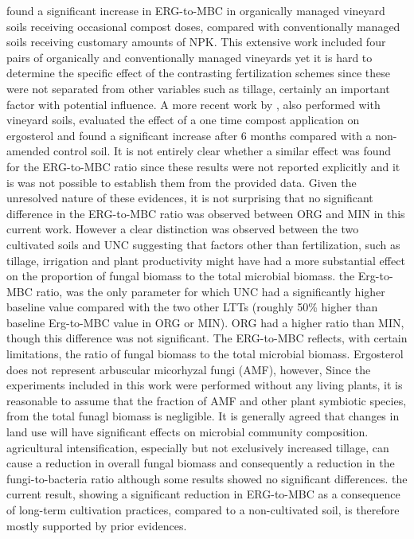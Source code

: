 	\citet{probst2008} found a significant increase in ERG-to-MBC in organically managed vineyard soils receiving occasional compost doses, compared with conventionally managed soils receiving customary amounts of NPK. This extensive work included four pairs of organically and conventionally managed vineyards yet it is hard to determine the specific effect of the contrasting fertilization schemes since these were not separated from other variables such as tillage, certainly an important factor with potential influence. A more recent work by \citet{mackie2015} , also performed with vineyard soils, evaluated the effect of a one time compost application on ergosterol and found a significant increase after 6 months compared with a non-amended control soil. It is not entirely clear whether a similar effect was found for the ERG-to-MBC ratio since these results were not reported explicitly and it is was not possible to establish them from the provided data.
	Given the unresolved nature of these evidences, it is not surprising that no significant difference in the ERG-to-MBC ratio was observed between ORG and MIN in this current work. However a clear distinction was observed between the two cultivated soils and UNC suggesting that factors other than fertilization, such as tillage, irrigation and plant productivity might have had a more substantial effect on the proportion of fungal biomass to the total microbial biomass.
	the Erg-to-MBC ratio, was the only parameter for which UNC had a significantly higher baseline value compared with the two other LTTs (roughly 50\% higher than baseline Erg-to-MBC value in ORG or MIN).
	ORG had a higher ratio than MIN, though this difference was not significant. The ERG-to-MBC reflects, with certain limitations, the ratio of fungal biomass to the total microbial biomass. Ergosterol does not represent arbuscular micorhyzal fungi (AMF), however, Since the experiments included in this work were performed without any living plants, it is reasonable to assume that the fraction of AMF and other plant symbiotic species, from the total funagl biomass is negligible.
	It is generally agreed that changes in land use will have significant effects on microbial community composition\myRed{*}. agricultural intensification, especially but not exclusively increased tillage, can cause a reduction in overall fungal biomass and consequently a reduction in the fungi-to-bacteria ratio\myRed{*} although some results showed no significant differences\myRed{*}.
	the current result, showing a significant reduction in ERG-to-MBC as a consequence of long-term cultivation practices, compared to a non-cultivated soil, is therefore mostly supported by prior evidences.
